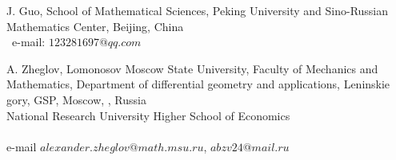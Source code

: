 \documentclass[11pt]{article}
\theoremstyle{definition}
\theoremstyle{plain}
\numberwithin{equation}{section}
\begin{document}
\noindent J. Guo,  School of Mathematical Sciences, Peking University and Sino-Russian Mathematics Center,  Beijing, China 
\\ 
\noindent\ e-mail:
$123281697@qq.com$

\vspace{0.5cm}

\noindent A. Zheglov, Lomonosov Moscow State  University, Faculty
of Mechanics and Mathematics, Department of differential geometry
and applications, Leninskie gory, GSP, Moscow, ,
Russia\\
National Research University Higher School of Economics\\
\\ \noindent e-mail
 $alexander.zheglov@math.msu.ru$, $abzv24@mail.ru$
\end{document}
